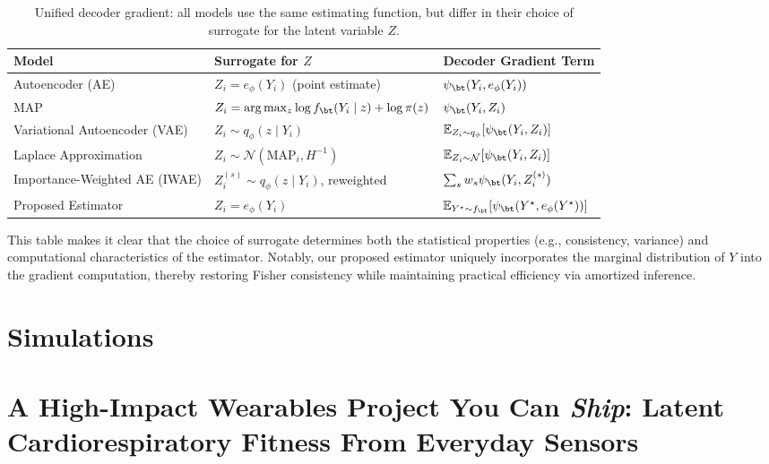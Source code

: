 \begin{table}[h]
\centering
\caption{Unified decoder gradient: all models use the same estimating function, but differ in their choice of surrogate for the latent variable \( Z \).}
\label{tab:surrogates}
\begin{tabular}{lll}
\toprule
\textbf{Model} & \textbf{Surrogate for \( Z \)} & \textbf{Decoder Gradient Term} \\
\midrule
Autoencoder (AE) & \( Z_i = e_\phi(Y_i) \) (point estimate) & 
\(
\psi_\bt(Y_i, e_\phi(Y_i))
\) \\

MAP & \( Z_i = \arg\max_z \log f_\bt(Y_i \mid z) + \log \pi(z) \) & 
\(
\psi_\bt(Y_i, Z_i)
\) \\

Variational Autoencoder (VAE) & \( Z_i \sim q_\phi(z \mid Y_i) \) & 
\(
\mathbb{E}_{Z_i \sim q_\phi}[\psi_\bt(Y_i, Z_i)]
\) \\

Laplace Approximation & \( Z_i \sim \mathcal{N}(\text{MAP}_i, H^{-1}) \) & 
\(
\mathbb{E}_{Z_i \sim \mathcal{N}}[\psi_\bt(Y_i, Z_i)]
\) \\

Importance-Weighted AE (IWAE) & \( Z_i^{(s)} \sim q_\phi(z \mid Y_i) \), reweighted & 
\(
\sum_s w_s \psi_\bt(Y_i, Z_i^{(s)})
\) \\

Proposed Estimator & \( Z_i = e_\phi(Y_i) \) & 
\(
\mathbb{E}_{Y^\star \sim f_\bt}[\psi_\bt(Y^\star, e_\phi(Y^\star))]
\) \\
\bottomrule
\end{tabular}
\end{table}

This table makes it clear that the choice of surrogate determines both the statistical properties (e.g., consistency, variance) and computational characteristics of the estimator. Notably, our proposed estimator uniquely incorporates the marginal distribution of \( Y \) into the gradient computation, thereby restoring Fisher consistency while maintaining practical efficiency via amortized inference.




\newpage
\section{Simulations}

\section*{A High-Impact Wearables Project You Can \emph{Ship}: 
Latent Cardiorespiratory Fitness From Everyday Sensors}

